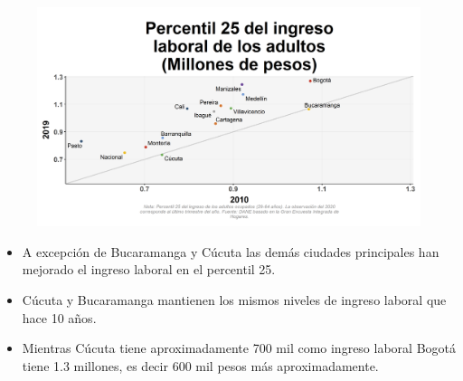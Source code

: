     \begin{figure}[H]
        \caption[Percentil 25 del ingreso laboral de los adultos por ciudades - 2010 VS 2019 ]{\label{inglab25adu_ciudad_scatter} }
        \begin{center}
        \includegraphics[width=\textwidth,keepaspectratio]{img/var_7_scatter_time.png}
        \end{center}
    \end{figure}
            \begin{itemize}
                \item A excepción de Bucaramanga y Cúcuta las demás ciudades principales han mejorado el ingreso laboral en el percentil 25.
                \item Cúcuta y Bucaramanga mantienen los mismos niveles de ingreso laboral que hace 10 años.
                \item Mientras Cúcuta tiene aproximadamente 700 mil como ingreso laboral Bogotá tiene 1.3 millones, es decir 600 mil pesos más aproximadamente.
                \end{itemize}

